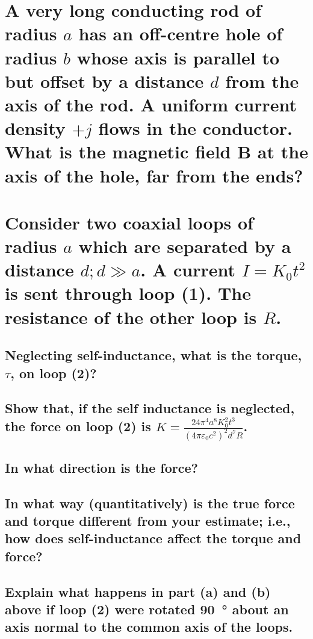 \documentclass[a4paper]{scrartcl}
\begin{document}
\section{A very long conducting rod of radius \(a\) has an off-centre hole of radius \(b\) whose axis is parallel to but offset by a distance \(d\) from the axis of the rod. A uniform current density \(+j\) flows in the conductor. What is the magnetic field \(\mathbf{B}\) at the axis of the hole, far from the ends?}

\section{Consider two coaxial loops of radius \(a\) which are separated by a distance \(d; d \gg a\). A current \(I = K_0 t^2\) is sent through loop (1). The resistance of the other loop is \(R\).}
\subsection{Neglecting self-inductance, what is the torque, \(\tau\), on loop (2)?}

\subsection{Show that, if the self inductance is neglected, the force on loop (2) is \(K = \frac{24 \pi^4 a^8 K_0^2 t^3}{(4 \pi \varepsilon_0 c^2)^2 d^7 R}\).}

\subsection{In what direction is the force?}

\subsection{In what way (quantitatively) is the true force and torque different from your estimate; i.e., how does self-inductance affect the torque and force?}

\subsection{Explain what happens in part (a) and (b) above if loop (2) were rotated \SI{90}{\degree} about an axis normal to the common axis of the loops.}
\end{document}
